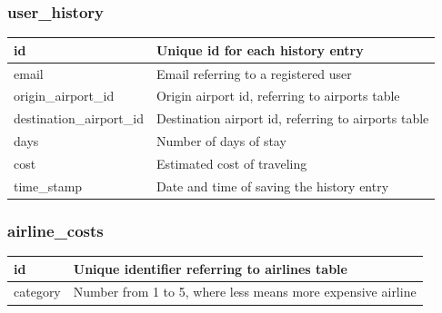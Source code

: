 \documentclass[12pt]{article}
\begin{document}
\subsubsection{user\_history}
\label{sec:orgbe89272}
\begin{center}
\begin{tabular}{p{3cm}|p{11cm}}
id & Unique id for each history entry\\[0pt]
  \hline
email & Email referring to a registered user\\[0pt]
  \hline
origin\_airport\_id & Origin airport id, referring to airports table\\[0pt]
  \hline
destination\_airport\_id & Destination airport id, referring to airports table\\[0pt]
  \hline
days & Number of days of stay\\[0pt]
  \hline
cost & Estimated cost of traveling\\[0pt]
  \hline
time\_stamp & Date and time of saving the history entry\\[0pt]
\end{tabular}
\end{center}

\subsubsection{airline\_costs}
\label{sec:orgedc7643}
\begin{center}
\begin{tabular}{p{3cm}|p{11cm}}
id & Unique identifier referring to airlines table\\[0pt]
  \hline
category & Number from 1 to 5, where less means more expensive airline\\[0pt]

\end{tabular}
\end{center}
\newpage
\end{document}

